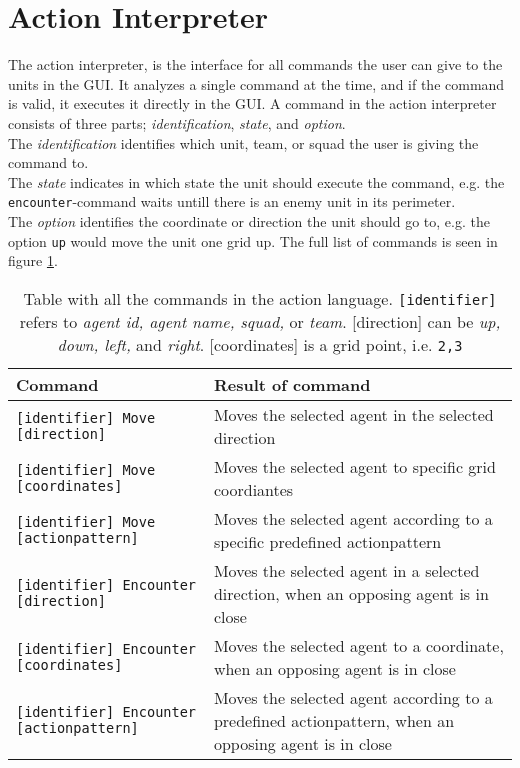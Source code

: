\section{Action Interpreter}
The action interpreter, is the interface for all commands the user can give to the units in the GUI. 
It analyzes a single command at the time, and if the command is valid, it executes it directly in the GUI.
A command in the action interpreter consists of three parts; \textit{identification}, \textit{state}, and \textit{option}.\\
The \textit{identification} identifies which unit, team, or squad the user is giving the command to.\\
The \textit{state} indicates in which state the unit should execute the command, e.g. the \texttt{encounter}-command waits untill there is an enemy unit in its perimeter.\\
The \textit{option} identifies the coordinate or direction the unit should go to, e.g. the option \texttt{up} would move the unit one grid up. The full list of commands is seen in figure \ref{ac_commands}.\\

\begin{center}
	\begin{table}[H]
    \begin{tabular}{| l | p{5cm} |}
    \hline
    Command & Result of command\\ \hline
    \texttt{[identifier] Move [direction]} & Moves the selected agent in the selected direction\\ \hline
    \texttt{[identifier] Move [coordinates]} & Moves the selected agent to specific grid coordiantes\\ \hline
		\texttt{[identifier] Move [actionpattern]} & Moves the selected agent according to a specific predefined actionpattern\\ \hline
		\texttt{[identifier] Encounter [direction]} & Moves the selected agent in a selected direction, when an opposing agent is in close\\ \hline
		\texttt{[identifier] Encounter [coordinates]} & Moves the selected agent to a coordinate, when an opposing agent is in close\\ \hline
		\texttt{[identifier] Encounter [actionpattern]} & Moves the selected agent according to a predefined actionpattern, when an opposing agent is in close\\ \hline
    \end{tabular}
		\caption{Table with all the commands in the action language. \texttt{[identifier]} refers to \textit{agent id, agent name, squad,} or \textit{team}. [direction] can be \textit{up, down, left,} and \textit{right}. [coordinates] is a grid point, i.e. \texttt{2,3}}
		\label{ac_commands}
	\end{table}
\end{center}

